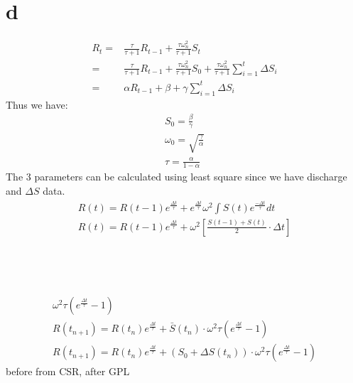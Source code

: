 \section{d}
\begin{align*}
	R_{t} = & \frac{\tau}{\tau + 1} R_{t-1} + \frac{\tau \omega_n^2}{\tau + 1}S_t \\
		  = & \frac{\tau}{\tau + 1} R_{t-1} + \frac{\tau \omega_n^2}{\tau + 1}S_0 + \frac{\tau \omega_n^2}{\tau + 1} \sum_{i=1}^{t} \Delta S_i \\
		  = & \alpha R_{t-1} + \beta + \gamma \sum_{i=1}^{t} \Delta S_i
\end{align*}
Thus we have:
\begin{gather*}
	S_0 = \frac{\beta}{\gamma} \\
	\omega_0 = \sqrt{\frac{\gamma}{\alpha}} \\
	\tau = \frac{\alpha}{1-\alpha}
\end{gather*}
The 3 parameters can be calculated using least square since we have discharge and $\Delta S$ data.
\clearpage
\begin{gather*}
	R(t) = R(t-1)e^{\frac{\Delta t}{\tau}} + e^{\frac{\Delta t}{\tau}} \omega^2 \int S(t) e^{\frac{-\Delta t}{\tau}} dt \\
	R(t) = R(t-1)e^{\frac{\Delta t}{\tau}} +  \omega^2\left[\frac{S(t-1) + S(t)}{2} \cdot \Delta t\right]
\end{gather*}\\\\\\\\

\begin{gather*}
	\omega^2 \tau (e^{\frac{\Delta t}{\tau}} - 1) \\
	R(t_{n+1}) = R(t_{n}) e^{\frac{\Delta t}{\tau}} + \bar{S}(t_{n}) \cdot \omega^2 \tau (e^{\frac{\Delta t}{\tau}} - 1) \\
	R(t_{n+1}) = R(t_{n}) e^{\frac{\Delta t}{\tau}} + \left(S_0 + \Delta S(t_{n})\right) \cdot \omega^2 \tau (e^{\frac{\Delta t}{\tau}} - 1)
\end{gather*}
before from CSR, after GPL